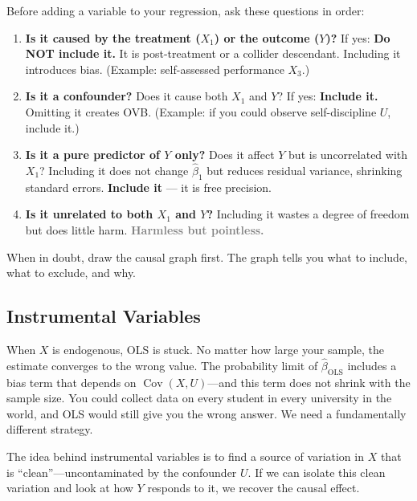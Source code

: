 \documentclass[11pt,a4paper]{article}
\theoremstyle{definition}
\theoremstyle{plain}
\theoremstyle{remark}
\newcommand{\Cov}{\operatorname{Cov}}
\newcommand{\bhat}{\hat{\beta}}
\newcommand{\bols}{\hat{\beta}_{\text{OLS}}}
\begin{document}
\begin{keyinsight}[title={Should I Include This Variable?}]
Before adding a variable to your regression, ask these questions in order:

\begin{enumerate}
  \item \textbf{Is it caused by the treatment ($X_1$) or the outcome ($Y$)?} If yes: \textcolor{biasred}{\textbf{Do NOT include it.}} It is post-treatment or a collider descendant. Including it introduces bias. (Example: self-assessed performance $X_3$.)

  \item \textbf{Is it a confounder?} Does it cause both $X_1$ and $Y$? If yes: \textcolor{repairgreen}{\textbf{Include it.}} Omitting it creates OVB. (Example: if you could observe self-discipline $U$, include it.)

  \item \textbf{Is it a pure predictor of $Y$ only?} Does it affect $Y$ but is uncorrelated with $X_1$? Including it does not change $\bhat_1$ but reduces residual variance, shrinking standard errors. \textcolor{repairgreen}{\textbf{Include it}} --- it is free precision.

  \item \textbf{Is it unrelated to both $X_1$ and $Y$?} Including it wastes a degree of freedom but does little harm. \textcolor{gray}{\textbf{Harmless but pointless.}}
\end{enumerate}

When in doubt, draw the causal graph first. The graph tells you what to include, what to exclude, and why.
\end{keyinsight}

\subsection{Instrumental Variables}

When $X$ is endogenous, OLS is stuck. No matter how large your sample, the estimate converges to the wrong value. The probability limit of $\bols$ includes a bias term that depends on $\Cov(X, U)$---and this term does not shrink with the sample size. You could collect data on every student in every university in the world, and OLS would still give you the wrong answer. We need a fundamentally different strategy.

The idea behind instrumental variables is to find a source of variation in $X$ that is ``clean''---uncontaminated by the confounder $U$. If we can isolate this clean variation and look at how $Y$ responds to it, we recover the causal effect.
\end{document}
